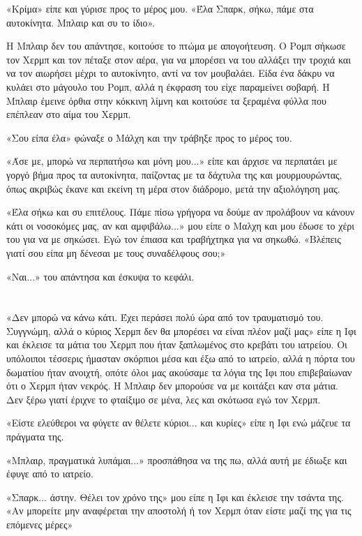 \documentclass[12pt,twoside, openany]{book}
\begin{document}
«Κρίμα» είπε και γύρισε προς το μέρος μου. «Έλα Σπαρκ, σήκω, πάμε στα αυτοκίνητα. Μπλαιρ και συ το ίδιο».

Η Μπλαιρ δεν του απάντησε, κοιτούσε το πτώμα με απογοήτευση. Ο Ρομπ σήκωσε τον Χερμπ και τον πέταξε στον αέρα, για να μπορέσει να του αλλάξει την τροχιά και να τον αιωρήσει μέχρι το αυτοκίνητο, αντί να τον μουβαλάει. Είδα ένα δάκρυ να κυλάει στο μάγουλο του Ρομπ, αλλά η έκφραση του είχε παραμείνει σοβαρή. Η Μπλαιρ έμεινε όρθια στην κόκκινη λίμνη και κοιτούσε τα ξεραμένα φύλλα που επέπλεαν στο αίμα του Χερμπ.

«Σου είπα έλα» φώναξε ο Μάλχη και την τράβηξε προς το μέρος του.

«Άσε με, μπορώ να περπατήσω και μόνη μου...» είπε και άρχισε να περπατάει με γοργό βήμα προς τα αυτοκίνητα, παίζοντας με τα δάχτυλα της και μουρμουρώντας, όπως ακριβώς έκανε και εκείνη τη μέρα στον διάδρομο, μετά την αξιολόγηση μας.

«Έλα σήκω και συ επιτέλους. Πάμε πίσω γρήγορα να δούμε αν προλάβουν να κάνουν κάτι οι νοσοκόμες μας, αν και αμφιβάλω...» μου είπε ο Μαλχη και μου έδωσε το χέρι του για να με σηκώσει. Εγώ τον έπιασα και τραβήχτηκα για να σηκωθώ. «Βλέπεις γιατί σου είπα μη δένεσαι με τους συναδέλφους σου;»

«Ναι...» του απάντησα και έσκυψα το κεφάλι.

\chapter{}

«Δεν μπορώ να κάνω κάτι. Έχει περάσει πολύ ώρα από τον τραυματισμό του. Συγγνώμη, αλλά ο κύριος Χερμπ δεν θα μπορέσει να είναι πλέον μαζί μας» είπε η Ιφι και έκλεισε τα μάτια του Χερμπ που ήταν ξαπλωμένος στο κρεβάτι του ιατρείου. Οι υπόλοιποι τέσσερις ήμασταν σκόρπιοι μέσα και έξω από το ιατρείο, αλλά η πόρτα του δωματίου ήταν ανοιχτή, οπότε όλοι μας ακούσαμε τα λόγια της Ιφι που επιβεβαίωναν ότι ο Χερμπ ήταν νεκρός. Η Μπλαιρ δεν μπορούσε να με κοιτάξει καν στα μάτια. Δεν ξέρω γιατί έριχνε το φταίξιμο σε μένα, λες και σκότωσα εγώ τον Χερμπ.

«Είστε ελεύθεροι να φύγετε αν θέλετε κύριοι... και κυρίες» είπε η Ιφι ενώ μάζευε τα πράγματα της.

«Μπλαιρ, πραγματικά λυπάμαι...» προσπάθησα να της πω, αλλά αυτή με έδιωξε και έφυγε από το ιατρείο.

«Σπαρκ... άστην. Θέλει τον χρόνο της» μου είπε η Ιφι και έκλεισε την τσάντα της. «Αν μπορείτε μην αναφέρεται την αποστολή ή τον Χερμπ όταν είστε μαζί της για τις επόμενες μέρες»
\end{document}
